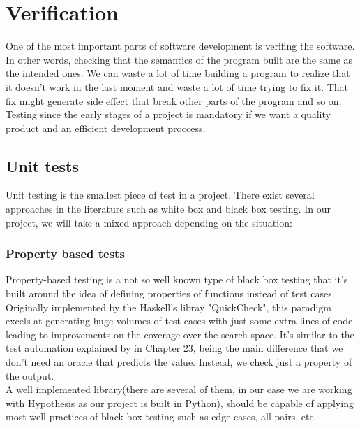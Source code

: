 \section{Verification}
  One of the most important parts of software development is verifing the
  software. In other words, checking that the semantics of the program built
  are the same as the intended ones. We can waste a lot of time building a
  program to realize that it doesn't work in the last moment and waste a lot
  of time trying to fix it. That fix might generate side effect that break other
  parts of the program and so on. Testing since the early stages of a project
  is mandatory if we want a quality product and an efficient development
  proccess.

  \subsection{Unit tests}

    Unit testing is the smallest piece of test in a project. There exist several
    approaches in the literature such as white box and black box testing. In
    our project, we will take a mixed approach depending on the situation:

    \subsubsection{Property based tests}

    Property-based testing is a not so well known type of black box testing that
    it's built around the idea of defining properties of functions instead of
    test cases. Originally implemented by the Haskell's libray
    "QuickCheck"\cite{QuickCheck}, this paradigm excels at generating huge
    volumes of test cases with just some extra lines of code leading
    to improvements on the coverage over the search space. It's similar to the
    test automation explained by \citet{Sommerville} in Chapter 23, being the
    main difference that we don't need an oracle that predicts the value.
    Instead, we check just a property of the output.\\

    A well implemented library(there are several of them, in our case we are
    working with Hypothesis\cite{Hypothesis} as our project is built in
    Python), should be capable of applying most well practices of black box
    testing such as edge cases, all pairs, etc.\\

